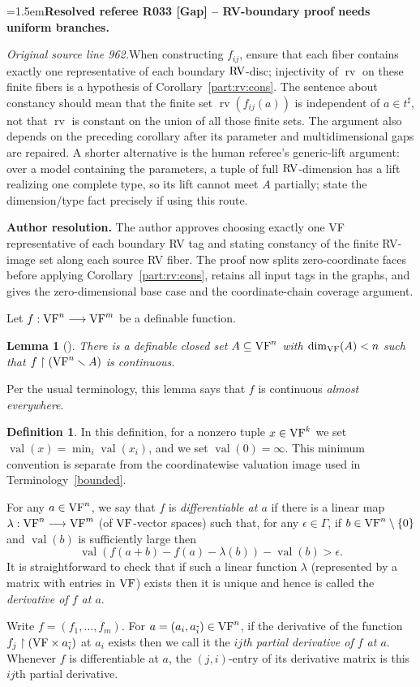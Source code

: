 \documentclass[12pt]{amsart}
\newcommand{\ResolvedRefereeRemark}[5]{%
  \par\medskip\begingroup\normalfont\small\color{gray}%
  \emergencystretch=1.5em\noindent\textbf{Resolved referee R#1 [#2] -- #3.}\par\nobreak\noindent #4\par
  \medskip\color{ResolutionGreen}\noindent\textbf{Author resolution.} #5\par
  \endgroup\medskip
}
\newcommand{\memph}[1]{{\color{magenta}\emph{#1}}}
\theoremstyle{plain}
\newtheorem{lem}[thm]{Lemma}
\theoremstyle{definition}
\newtheorem{defn}[thm]{Definition}
\theoremstyle{remark}
\numberwithin{equation}{section}
\theoremstyle{plain}
\newcommand{\VF}{\textup{VF}}
\newcommand{\RV}{\textup{RV}}
\newcommand{\0}{\emptyset}
\newcommand{\rest}{\upharpoonright}
\newcommand{\fun}{\longrightarrow}
\newcommand{\sub}{\subseteq}
\newcommand{\mi}{\smallsetminus}
\DeclareMathOperator{\rv}{rv}
\DeclareMathOperator{\vv}{val}
\begin{document}
\ResolvedRefereeRemark{033}{Gap}{RV-boundary proof needs uniform branches}{%
\textit{Original source line 962.}\quad When constructing $f_{ij}$, ensure that each fiber contains exactly one representative of each boundary $\RV$-disc; injectivity of $\rv$ on these finite fibers is a hypothesis of Corollary~\ref{part:rv:cons}. The sentence about constancy should mean that the finite set $\rv(f_{ij}(a))$ is independent of $a\in t^\sharp$, not that $\rv$ is constant on the union of all those finite sets. The argument also depends on the preceding corollary after its parameter and multidimensional gaps are repaired. A shorter alternative is the human referee's generic-lift argument: over a model containing the parameters, a tuple of full $\RV$-dimension has a lift realizing one complete type, so its lift cannot meet $A$ partially; state the dimension/type fact precisely if using this route.
}{The author approves choosing exactly one VF representative of each boundary RV tag and stating constancy of the finite RV-image set along each source RV fiber. The proof now splits zero-coordinate faces before applying Corollary~\ref{part:rv:cons}, retains all input tags in the graphs, and gives the zero-dimensional base case and the coordinate-chain coverage argument.}

Let $f : \VF^n \fun \VF^m$ be a definable function.

\begin{lem}[{\cite[Lemma~8.7]{Yin:special:trans}}]\label{fun:almost:cont}
There is a definable closed set $A \sub \VF^n$ with $\dim_{\VF}(A) < n$ such that $f \rest (\VF^n \mi A)$ is continuous.
\end{lem}

Per the usual terminology, this lemma says that $f$ is continuous \memph{almost everywhere}.

\begin{defn}\label{defn:diff}
In this definition, for a nonzero tuple $x\in\VF^k$ we set $\vv(x)=\min_i\vv(x_i)$, and we set $\vv(0)=\infty$. This minimum convention is separate from the coordinatewise valuation image used in Terminology~\ref{bounded}.


For any $a \in \VF^n$, we say that $f$ is \memph{differentiable at $a$} if there is a linear map $\lambda : \VF^n \fun \VF^m$ (of $\VF$-vector spaces) such that, for any $\epsilon \in \Gamma$, if $b \in \VF^n\setminus\{0\}$ and $\vv(b)$ is sufficiently large then
\[
\vv(f(a + b) - f(a) - \lambda(b)) - \vv(b) > \epsilon.
\]
It is straightforward to check that if such a linear function $\lambda$ (represented by a matrix with entries in $\VF$) exists then it is unique and hence is called the \memph{derivative of $f$ at $a$}.

Write $f = (f_1, \ldots, f_m)$. For $a = (a_i, a_{\tilde i}) \in \VF^n$, if the derivative of the function $f_j \rest (\VF \times a_{\tilde i})$ at $a_i$ exists then we call it the \memph{$ij$th partial derivative of $f$ at $a$}. Whenever $f$ is differentiable at $a$, the $(j,i)$-entry of its derivative matrix is this $ij$th partial derivative.
\end{defn}
\end{document}
